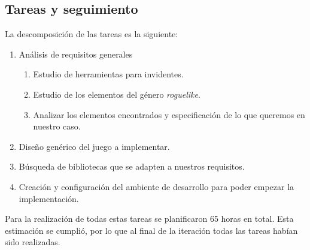 \subsection{Tareas y seguimiento}

La descomposición de las tareas es la siguiente:

\begin{enumerate}[label=\bfseries WBS 1.\arabic*]
  \item Análisis de requisitos generales
    \begin{enumerate}[label=\bfseries WBS 1.1.\arabic*]
      \item Estudio de herramientas para invidentes.
      \item Estudio de los elementos del género \textit{roguelike}.
      \item Analizar los elementos encontrados y especificación de lo que queremos en nuestro caso.
    \end{enumerate}
  \item Diseño genérico del juego a implementar.
  \item Búsqueda de bibliotecas que se adapten a nuestros requisitos.
  \item Creación y configuración del ambiente de desarrollo para poder empezar la implementación.
\end{enumerate}

Para la realización de todas estas tareas se planificaron 65 horas en total. Esta estimación se cumplió, por lo que al final de la iteración todas las tareas habían sido realizadas.